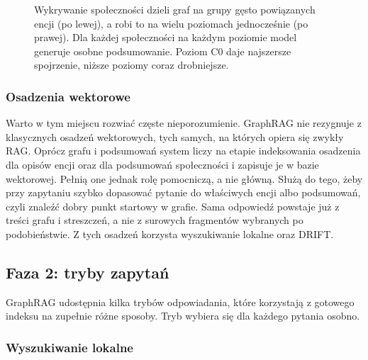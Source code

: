 \documentclass[11pt,a4paper]{article}
\begin{document}
\begin{figure}[h!]
\caption{Wykrywanie społeczności dzieli graf na grupy gęsto powiązanych encji (po lewej), a
robi to na wielu poziomach jednocześnie (po prawej). Dla każdej społeczności na każdym
poziomie model generuje osobne podsumowanie. Poziom C0 daje najszersze spojrzenie, niższe
poziomy coraz drobniejsze.}
\label{fig:comm}
\end{figure}

\subsubsection{Osadzenia wektorowe}

Warto w tym miejscu rozwiać częste nieporozumienie. GraphRAG nie rezygnuje z klasycznych
osadzeń wektorowych, tych samych, na których opiera się zwykły RAG. Oprócz grafu i podsumowań
system liczy na etapie indeksowania osadzenia dla opisów encji oraz dla podsumowań
społeczności i zapisuje je w bazie wektorowej. Pełnią one jednak rolę pomocniczą, a nie
główną. Służą do tego, żeby przy zapytaniu szybko dopasować pytanie do właściwych encji albo
podsumowań, czyli znaleźć dobry punkt startowy w grafie. Sama odpowiedź powstaje już z treści
grafu i streszczeń, a nie z surowych fragmentów wybranych po podobieństwie.
Z tych osadzeń korzysta wyszukiwanie lokalne oraz DRIFT.

\subsection{Faza 2: tryby zapytań}

GraphRAG udostępnia kilka trybów odpowiadania, które korzystają z gotowego indeksu na zupełnie
różne sposoby. Tryb wybiera się dla każdego pytania osobno.

\subsubsection{Wyszukiwanie lokalne}
\end{document}
